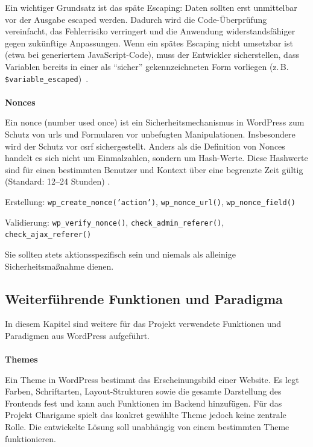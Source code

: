 Ein wichtiger Grundsatz ist das späte Escaping: Daten sollten erst unmittelbar vor der Ausgabe escaped werden.
Dadurch wird die Code-Überprüfung vereinfacht, das Fehlerrisiko verringert und die Anwendung widerstandsfähiger gegen zukünftige Anpassungen.
Wenn ein spätes Escaping nicht umsetzbar ist (etwa bei generiertem JavaScript-Code), muss der Entwickler sicherstellen, dass Variablen bereits in einer als \enquote{sicher} gekennzeichneten Form vorliegen (z.\,B. \texttt{\$variable\_escaped})~\cite{wordpress2024escapingcant}.
\\\\
\textbf{Nonces}

Ein \gls{nonce} (number used once) ist ein Sicherheitsmechanismus in WordPress zum Schutz von \gls{url}s und Formularen vor unbefugten Manipulationen.
Insbesondere wird der Schutz vor \gls{csrf} sichergestellt.
Anders als die Definition von Nonces handelt es sich nicht um Einmalzahlen, sondern um Hash-Werte.
Diese Hashwerte sind für einen bestimmten Benutzer und Kontext über eine begrenzte Zeit gültig (Standard: 12–24 Stunden) \cite{wordpress2024nonces}.

Erstellung: \texttt{wp\_create\_nonce('action')}, \texttt{wp\_nonce\_url()}, \texttt{wp\_nonce\_field()}

Validierung: \texttt{wp\_verify\_nonce()}, \texttt{check\_admin\_referer()}, \texttt{check\_ajax\_referer()}

Sie sollten stets aktionsspezifisch sein und niemals als alleinige Sicherheitsmaßnahme dienen.

\subsection{Weiterführende Funktionen und Paradigma}
In diesem Kapitel sind weitere für das Projekt verwendete Funktionen und Paradigmen aus WordPress aufgeführt.
\\
\\
\textbf{Themes}

Ein Theme in WordPress bestimmt das Erscheinungsbild einer Website.
Es legt Farben, Schriftarten, Layout-Strukturen sowie die gesamte Darstellung des Frontends fest und kann auch Funktionen im Backend hinzufügen. \cite{wordpress2024theme}
Für das Projekt Charigame spielt das konkret gewählte Theme jedoch keine zentrale Rolle.
Die entwickelte Lösung soll unabhängig von einem bestimmten Theme funktionieren.



